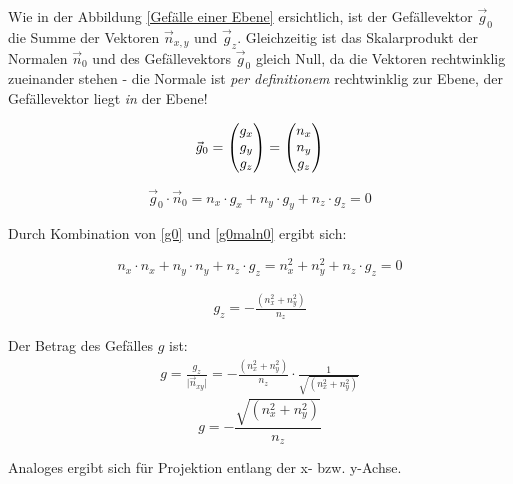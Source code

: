 Wie in der Abbildung \cref{Gefälle einer Ebene} ersichtlich, ist der Gefällevektor $\vec{g}_{0}$ die Summe der Vektoren $\vec{n}_{x, y}$ und $\vec{g}_{z}$. Gleichzeitig ist das Skalarprodukt der Normalen $\vec{n}_{0}$ und des Gefällevektors $\vec{g}_{0}$ gleich Null, da die Vektoren rechtwinklig zueinander stehen - die Normale ist \emph{per definitionem} rechtwinklig zur Ebene, der Gefällevektor liegt \emph{in} der Ebene!

\begin{equation}
	\label{g0}
	\vec{g}_{0} =  \begin{pmatrix} g_{x} \\ g_{y} \\ g_{z} \end{pmatrix} = \begin{pmatrix} n_{x} \\ n_{y} \\ g_{z} \end{pmatrix}
\end{equation}
 
\begin{equation}
	\label{g0maln0}
	\vec{g}_{0} \cdot \vec{n}_{0} =  n_{x} \cdot g_{x} +  n_{y} \cdot g_{y} + n_{z} \cdot  g_{z} = 0
\end{equation}

Durch Kombination von \cref{g0} und \cref{g0maln0} ergibt sich:

\begin{equation}
	\nonumber
	n_{x} \cdot n_{x} +  n_{y} \cdot n_{y} + n_{z} \cdot  g_{z} = n_{x}^{2} + n_{y}^{2} + n_{z} \cdot g_{z} = 0
\end{equation}

\begin{align}
	\boxed{ g_{z} = - \frac{(n_{x}^{2} + n_{y}^{2} )}{n_{z}} }
\end{align}

Der Betrag des Gefälles $g$ ist:
\begin{align*}
	g=\frac{ g_{z}}{ \lvert \vec{n}_{xy} \rvert }
	=- \frac{(n_{x}^{2} + n_{y}^{2})}{n_{z}} \cdot \frac{1}{\sqrt{(n_{x}^{2} + n_{y}^{2})}}
\end{align*}
\begin{equation}
	\boxed{g= - \frac{\sqrt{(n_{x}^{2} + n_{y}^{2})}}{n_{z}} }
\end{equation}

Analoges ergibt sich für Projektion entlang der x- bzw. y-Achse.

